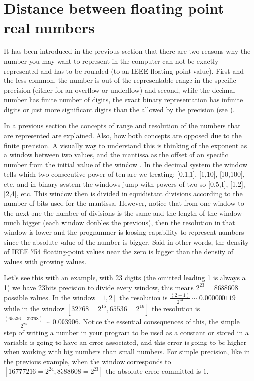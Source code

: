 \newpage 
\FloatBarrier
    \section{Distance between floating point real numbers} \label{sec:roundoff}

It has been introduced in the previous section that there are two reasons why the number you may want to represent in the computer can not be 
exactly represented and has to be rounded (to an IEEE floating-point value). First and the less common, the number is out of the 
representable range in the specific precision (either for an overflow or underflow) and second, while the decimal number has finite number of 
digits, the exact binary representation has infinite digits or just more significant digits than the allowed by the precision (see 
\cite{articleIEEE}). 

In a previous section the concepts of range and resolution of the numbers that are represented are explained. Also, how both concepts are 
opposed due to the finite precision. A visually way to understand this is thinking of the exponent as a window between two values, and the 
mantissa as the offset of an specific number from the initial value of the window \cite{VisExpl}. In the decimal system the window tells 
which two consecutive power-of-ten are we treating: [0.1,1], [1,10], [10,100], etc. and in binary system the windows jump with powers-of-two 
so [0.5,1], [1,2], [2,4], etc. This window then is divided in equidistant divisions according to the number of bits used for the mantissa. 
However, notice that from one window to the next one the number of divisions is the same and the length of the window much bigger (each 
window doubles the previous), then the resolution in that window is lower and the programmer is loosing capability to represent numbers since 
the absolute value of the number is bigger. Said in other words, the density of IEEE 754 floating-point values near the zero is bigger than 
the density of values with growing values. 

Let's see this with an example, with 23 digits (the omitted leading 1 is always a 1) we have 23bits precision to divide every window, this 
means $2^{23} = 8688608$ possible values. In the window $\left[1,2\right]$ the resolution is $\frac{\left(2-1\right)}{2^{23}} \sim 
0.000000119$ while in the window $\left[32768=2^{15},65536=2^{16}\right]$ the resolution is $\frac{\left(65536-32768\right)}{2^{23}} \sim 
0.003906$. Notice the essential consequences of this, the simple step of writing a number in your program to be used as a constant or stored 
in a variable is going to have an error associated, and this error is going to be higher when working with big numbers than small numbers. 
For simple precision, like in the previous example, when the window corresponds to $\left[16777216=2^{24},8388608=2^{23}\right]$ the absolute 
error committed is $1$. 

